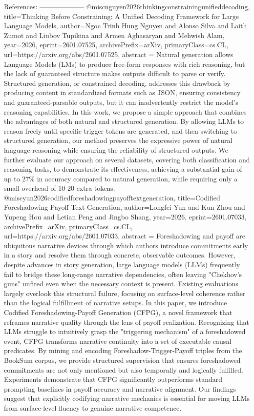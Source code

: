         References:
        --------------------
        @misc{nguyen2026thinkingconstrainingunifieddecoding,
      title={Thinking Before Constraining: A Unified Decoding Framework for Large Language Models}, 
      author={Ngoc Trinh Hung Nguyen and Alonso Silva and Laith Zumot and Liubov Tupikina and Armen Aghasaryan and Mehwish Alam},
      year={2026},
      eprint={2601.07525},
      archivePrefix={arXiv},
      primaryClass={cs.CL},
      url={https://arxiv.org/abs/2601.07525},
      abstract = {Natural generation allows Language Models (LMs) to produce free-form responses with rich reasoning, but the lack of guaranteed structure makes outputs difficult to parse or verify. Structured generation, or constrained decoding, addresses this drawback by producing content in standardized formats such as JSON, ensuring consistency and guaranteed-parsable outputs, but it can inadvertently restrict the model's reasoning capabilities. In this work, we propose a simple approach that combines the advantages of both natural and structured generation. By allowing LLMs to reason freely until specific trigger tokens are generated, and then switching to structured generation, our method preserves the expressive power of natural language reasoning while ensuring the reliability of structured outputs. We further evaluate our approach on several datasets, covering both classification and reasoning tasks, to demonstrate its effectiveness, achieving a substantial gain of up to 27\% in accuracy compared to natural generation, while requiring only a small overhead of 10-20 extra tokens.}
}@misc{yun2026codifiedforeshadowingpayofftextgeneration,
      title={Codified Foreshadowing-Payoff Text Generation}, 
      author={Longfei Yun and Kun Zhou and Yupeng Hou and Letian Peng and Jingbo Shang},
      year={2026},
      eprint={2601.07033},
      archivePrefix={arXiv},
      primaryClass={cs.CL},
      url={https://arxiv.org/abs/2601.07033},
      abstract = {Foreshadowing and payoff are ubiquitous narrative devices through which authors introduce commitments early in a story and resolve them through concrete, observable outcomes. However, despite advances in story generation, large language models (LLMs) frequently fail to bridge these long-range narrative dependencies, often leaving "Chekhov's guns" unfired even when the necessary context is present. Existing evaluations largely overlook this structural failure, focusing on surface-level coherence rather than the logical fulfillment of narrative setups. In this paper, we introduce Codified Foreshadowing-Payoff Generation (CFPG), a novel framework that reframes narrative quality through the lens of payoff realization. Recognizing that LLMs struggle to intuitively grasp the "triggering mechanism" of a foreshadowed event, CFPG transforms narrative continuity into a set of executable causal predicates. By mining and encoding Foreshadow-Trigger-Payoff triples from the BookSum corpus, we provide structured supervision that ensures foreshadowed commitments are not only mentioned but also temporally and logically fulfilled. Experiments demonstrate that CFPG significantly outperforms standard prompting baselines in payoff accuracy and narrative alignment. Our findings suggest that explicitly codifying narrative mechanics is essential for moving LLMs from surface-level fluency to genuine narrative competence.}
}
